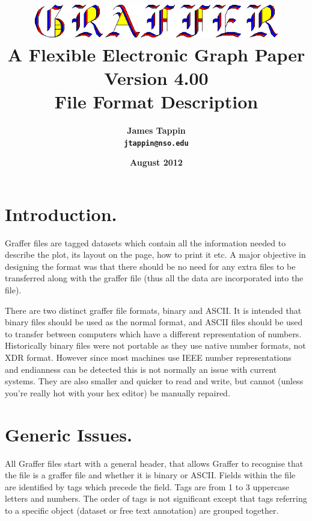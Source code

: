 \documentclass[english]{article}
\begin{document}
\title{\includegraphics[width=0.80\textwidth]{logo} \\
A Flexible Electronic Graph Paper\\
Version 4.00\\
File Format Description}

\author{\textsf{\textbf{\Large James Tappin}}\\
\texttt{\textbf{\Large jtappin@nso.edu}}}

\date{\textsf{\textbf{\large August 2012}}}

\maketitle

\tableofcontents{}
\section{Introduction.}

Graffer files are tagged datasets which contain all the information
needed to describe the plot, its layout on the page, how to print
it etc. A major objective in designing the format was that there should
be no need for any extra files to be transferred along with the graffer
file (thus all the data are incorporated into the file).

There are two distinct graffer file formats, binary and ASCII. It is
intended that binary files should be used as the normal format, and
ASCII files should be used to transfer between computers which have a
different representation of numbers. Historically binary files were not
portable as they use native number formats, not XDR format. However
since most machines use IEEE number representations and endianness can
be detected this is not normally an issue with current systems. They
are also smaller and quicker to read and write, but cannot (unless
you're really hot with your hex editor) be manually repaired.


\section{Generic Issues.}

All Graffer files start with a general header, that allows Graffer
to recognise that the file is a graffer file and whether it is binary
or ASCII. Fields within the file are identified by tags which precede
the field. Tags are from 1 to 3 uppercase letters and numbers. The
order of tags is not significant except that tags referring to a specific
object (dataset or free text annotation) are grouped together.
\end{document}
